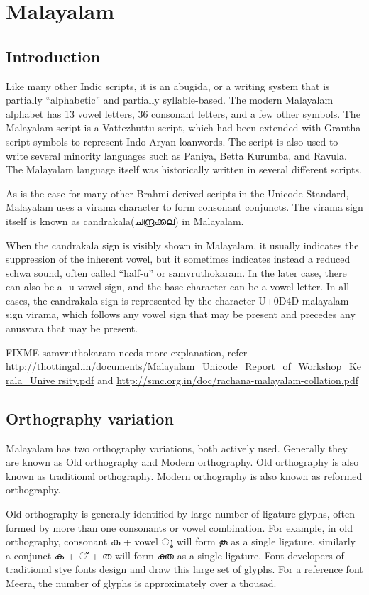 \chapter{Malayalam}
\section{Introduction}

Like many other Indic scripts, it is an abugida, or a writing system
that is partially “alphabetic” and partially syllable-based. The
modern Malayalam alphabet has 13 vowel letters, 36 consonant letters,
and a few other symbols. The Malayalam script is a Vattezhuttu script,
which had been extended with Grantha script symbols to represent
Indo-Aryan loanwords. The script is also used to write several
minority languages such as Paniya, Betta Kurumba, and Ravula. The
Malayalam language itself was historically written in several
different scripts.

As is the case for many other Brahmi-derived scripts in the Unicode
Standard, Malayalam uses a virama character to form consonant
conjuncts. The virama sign itself is known as candrakala({\meera ചന്ദ്രക്കല}) in
Malayalam.

When the candrakala sign is visibly shown in Malayalam, it usually
indicates the suppression of the inherent vowel, but it sometimes
indicates instead a reduced schwa sound, often called “half-u” or
samvruthokaram. In the later case, there can also be a -u vowel sign,
and the base character can be a vowel letter. In all cases, the
candrakala sign is represented by the character U+0D4D malayalam sign
virama, which follows any vowel sign that may be present and precedes
any anusvara that may be present.

FIXME samvruthokaram needs more explanation, refer
{\url{
http://thottingal.in/documents/Malayalam_Unicode_Report_of_Workshop_Kerala_Unive
rsity.pdf}}
and {\url{http://smc.org.in/doc/rachana-malayalam-collation.pdf}}

\section{Orthography variation}

Malayalam has two orthography variations, both actively
used. Generally they are known as Old orthography and Modern
orthography. Old orthography is also known as traditional
orthography. Modern orthography is also known as reformed orthography.

Old orthography is generally identified by large number of ligature
glyphs, often formed by more than one consonants or vowel
combination. For example, in old orthography, consonant {\meera ക} +
vowel { \meera ൂ} will form കൂ as a single ligature. similarly a
conjunct {\meera ക + ് + ത} will form {\meera ക്ത} as a single
ligature. Font developers of traditional stye fonts design and draw
this large set of glyphs. For a reference font Meera, the number of
glyphs is approximately over a thousad.

